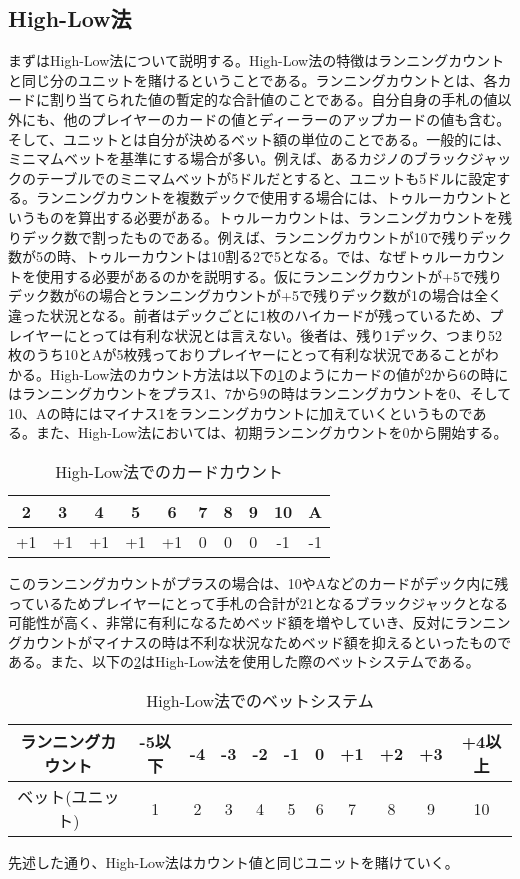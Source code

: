 \subsection{High-Low法}
まずはHigh-Low法について説明する。High-Low法の特徴はランニングカウントと同じ分のユニットを賭けるということである。ランニングカウントとは、各カードに割り当てられた値の暫定的な合計値のことである。自分自身の手札の値以外にも、他のプレイヤーのカードの値とディーラーのアップカードの値も含む。そして、ユニットとは自分が決めるベット額の単位のことである。一般的には、ミニマムベットを基準にする場合が多い。例えば、あるカジノのブラックジャックのテーブルでのミニマムベットが5ドルだとすると、ユニットも5ドルに設定する。ランニングカウントを複数デックで使用する場合には、トゥルーカウントというものを算出する必要がある。トゥルーカウントは、ランニングカウントを残りデック数で割ったものである。例えば、ランニングカウントが10で残りデック数が5の時、トゥルーカウントは10割る2で5となる。では、なぜトゥルーカウントを使用する必要があるのかを説明する。仮にランニングカウントが+5で残りデック数が6の場合とランニングカウントが+5で残りデック数が1の場合は全く違った状況となる。前者はデックごとに1枚のハイカードが残っているため、プレイヤーにとっては有利な状況とは言えない。後者は、残り1デック、つまり52枚のうち10とAが5枚残っておりプレイヤーにとって有利な状況であることがわかる。High-Low法のカウント方法は以下の\ref{hlc}のようにカードの値が2から6の時にはランニングカウントをプラス1、7から9の時はランニングカウントを0、そして10、Aの時にはマイナス1をランニングカウントに加えていくというものである。また、High-Low法においては、初期ランニングカウントを0から開始する。
\begin{table}[H]
\centering
\begin{tabular}{|c|c|c|c|c|c|c|c|c|c|}
\caption{High-Low法でのカードカウント\label{hlc}}
\hline
2&3&4&5&6&7&8&9&10&A \\ \hline
+1&+1&+1&+1&+1&0&0&0&-1&-1 \\ \hline
\end{tabular}
\end{table}
このランニングカウントがプラスの場合は、10やAなどのカードがデック内に残っているためプレイヤーにとって手札の合計が21となるブラックジャックとなる可能性が高く、非常に有利になるためベッド額を増やしていき、反対にランニングカウントがマイナスの時は不利な状況なためベッド額を抑えるといったものである。また、以下の\ref{hlb}はHigh-Low法を使用した際のベットシステムである。
\begin{table}[H]
\centering
\caption{High-Low法でのベットシステム\label{hlb}}
\begin{tabular}{|c|c|c|c|c|c|c|c|c|c|c|}
\hline
ランニングカウント&-5以下&-4&-3&-2&-1&0&+1&+2&+3&+4以上 \\ \hline
ベット(ユニット)&1&2&3&4&5&6&7&8&9&10 \\ \hline
\end{tabular}
\end{table}
先述した通り、High-Low法はカウント値と同じユニットを賭けていく。

